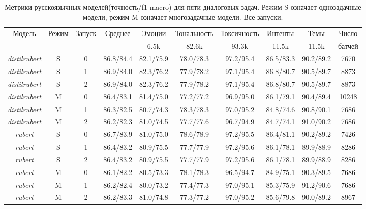 \begin{table*}
\caption{Метрики русскоязычных моделей(точность/f1 macro) для пяти диалоговых задач. Режим S означает однозадачные модели, режим M означает многозадачные модели. Все запуски.}
\label{appendix:ru_results}
\begin{tabular}{|c|c|c||c|c|c|c|c|c||c|} \hline
\multirow{2}{*}{Модель} & \multirow{2}{*}{Режим} &  \multirow{2}{*}{Запуск}  & \multirow{2}{*}{Среднее} & Эмоции & Тональность & Токсичность & Интенты & Темы & Число \\
& & & & 6.5k & 82.6k & 93.3k & 11.5k & 11.5k & батчей \\ \hline
\hline \hline
\textit{distilrubert} & S & 0 & 86.8/84.4 & 82.1/75.9 & 78.0/78.3 & 97.2/95.4 & 86.5/83.3 & 90.2/89.2 & 7670 \\ \hline
\textit{distilrubert} & S & 1 & 86.9/84.0 & 82.3/76.2 & 77.9/78.2 & 97.1/95.4 & 86.8/80.7 & 90.5/89.7 & 8873 \\ \hline
\textit{distilrubert} & S & 2 & 86.9/84.0 & 82.3/76.2 & 77.9/78.2 & 97.1/95.4 & 86.8/80.7 & 90.5/89.7 & 8873 \\ \hline
\textit{distilrubert} & M & 0 & 86.4/83.1 & 81.4/75.0 & 77.2/77.2 & 96.9/95.0 & 86.1/79.1 & 90.4/89.4 & 10248 \\ \hline
\textit{distilrubert} & M & 1 & 86.3/82.5 & 80.7/74.3 & 78.3/78.3 & 97.0/95.2 & 84.8/74.6 & 90.8/90.1 & 7686 \\ \hline
\textit{distilrubert} & M & 2 & 86.2/82.3 & 81.0/74.5 & 77.7/77.6 & 96.7/94.9 & 84.7/74.1 & 91.0/90.2 & 7686 \\ \hline
\textit{rubert} & S & 0 & 86.7/83.9 & 81.0/75.0 & 78.6/78.9 & 97.2/95.5 & 86.4/81.1 & 90.2/89.2 & 7426 \\ \hline
\textit{rubert} & S & 1 & 86.4/83.2 & 80.9/75.5 & 77.7/77.9 & 97.2/95.6 & 86.1/78.1 & 89.9/88.9 & 8286 \\ \hline
\textit{rubert} & S & 2 & 86.4/83.2 & 80.9/75.5 & 77.7/77.9 & 97.2/95.6 & 86.1/78.1 & 89.9/88.9 & 8286 \\ \hline
\textit{rubert} & M & 0 & 86.1/82.2 & 80.5/73.3 & 78.1/78.3 & 96.5/94.7 & 84.9/75.1 & 90.3/89.5 & 7686 \\ \hline
\textit{rubert} & M & 1 & 86.2/82.4 & 80.0/73.2 & 77.4/77.3 & 97.0/95.1 & 85.3/75.9 & 91.2/90.6 & 7686 \\ \hline
\textit{rubert} & M & 2 & 86.2/83.3 & 81.0/74.8 & 77.3/77.2 & 97.0/95.2 & 85.6/79.8 & 90.0/89.2 & 8967 \\ \hline
\end{tabular}
\end{table*}


